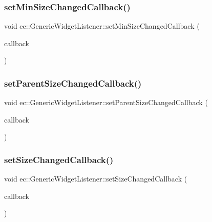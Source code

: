 \subsubsection{\texorpdfstring{set\+Min\+Size\+Changed\+Callback()}{setMinSizeChangedCallback()}}
{\footnotesize\ttfamily void ec\+::\+Generic\+Widget\+Listener\+::set\+Min\+Size\+Changed\+Callback (\begin{DoxyParamCaption}\item[{const \mbox{\hyperlink{classec_1_1_generic_widget_listener_a3a7f28218f30331b12bc00d05f4bc34f}{Min\+Size\+Changed\+\_\+\+Callback}} \&}]{callback }\end{DoxyParamCaption})}

\mbox{\label{classec_1_1_generic_widget_listener_aaa4ba3b0f552b8b55d02fb8d20fa13e6}} 
\subsubsection{\texorpdfstring{set\+Parent\+Size\+Changed\+Callback()}{setParentSizeChangedCallback()}}
{\footnotesize\ttfamily void ec\+::\+Generic\+Widget\+Listener\+::set\+Parent\+Size\+Changed\+Callback (\begin{DoxyParamCaption}\item[{const \mbox{\hyperlink{classec_1_1_generic_widget_listener_acf92a781f3b2f06053cd1c100b6763d3}{Parent\+Size\+Changed\+\_\+\+Callback}} \&}]{callback }\end{DoxyParamCaption})}

\mbox{\label{classec_1_1_generic_widget_listener_a0134a3a31286124c989a27846ff8fb3d}} 
\subsubsection{\texorpdfstring{set\+Size\+Changed\+Callback()}{setSizeChangedCallback()}}
{\footnotesize\ttfamily void ec\+::\+Generic\+Widget\+Listener\+::set\+Size\+Changed\+Callback (\begin{DoxyParamCaption}\item[{const \mbox{\hyperlink{classec_1_1_generic_widget_listener_aa47779ac982662cd4466132fa13fae68}{Size\+Changed\+\_\+\+Callback}} \&}]{callback }\end{DoxyParamCaption})}

